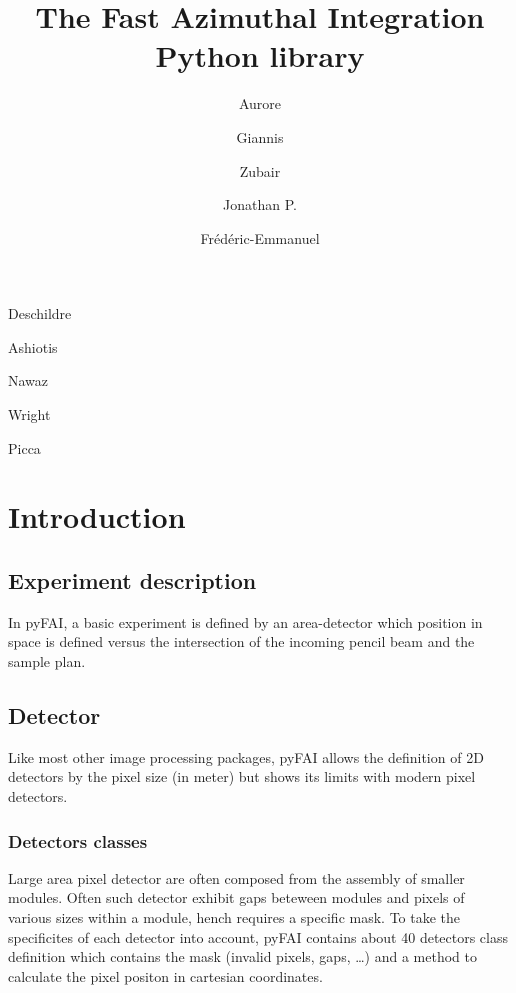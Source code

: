 \documentclass[preprint]{iucr}
\begin{document}
\title{The Fast Azimuthal Integration Python library}

    \author[a]{Aurore}{Deschildre}
    \author[a]{Giannis}{Ashiotis}
    \author[b]{Zubair}{Nawaz}
    \author[a]{Jonathan P.}{Wright}
    \author[c]{Fr\'ed\'eric-Emmanuel}{Picca}

\maketitle

\begin{synopsis}

\end{synopsis}

\begin{abstract}
\end{abstract}

\section{Introduction}

\subsection{Experiment description}
In pyFAI, a basic experiment is defined by an area-detector which position in
space is defined versus the intersection of the incoming pencil beam and the
sample plan.

\subsection{Detector}
Like most other image processing packages, pyFAI allows the definition of 2D
detectors by the pixel size (in meter) but shows its limits with modern pixel
detectors.

\subsubsection{Detectors classes}
Large area pixel detector are often composed from the assembly of smaller
modules. Often such detector exhibit gaps beteween modules and pixels of various
sizes within a module, hench requires a specific mask.
To take the specificites of each detector into account, pyFAI contains about
40 detectors class definition which contains the mask (invalid pixels, gaps,
\ldots) and a method to calculate the pixel positon in cartesian coordinates.
\end{document}
